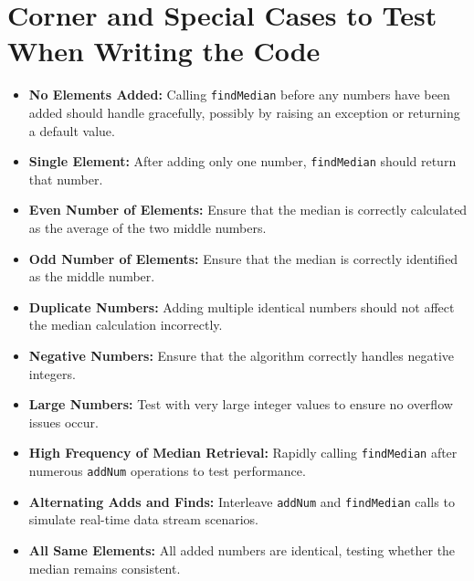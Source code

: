 \section*{Corner and Special Cases to Test When Writing the Code}

\begin{itemize}
    \item \textbf{No Elements Added:} Calling \texttt{findMedian} before any numbers have been added should handle gracefully, possibly by raising an exception or returning a default value.
    
    \item \textbf{Single Element:} After adding only one number, \texttt{findMedian} should return that number.
    
    \item \textbf{Even Number of Elements:} Ensure that the median is correctly calculated as the average of the two middle numbers.
    
    \item \textbf{Odd Number of Elements:} Ensure that the median is correctly identified as the middle number.
    
    \item \textbf{Duplicate Numbers:} Adding multiple identical numbers should not affect the median calculation incorrectly.
    
    \item \textbf{Negative Numbers:} Ensure that the algorithm correctly handles negative integers.
    
    \item \textbf{Large Numbers:} Test with very large integer values to ensure no overflow issues occur.
    
    \item \textbf{High Frequency of Median Retrieval:} Rapidly calling \texttt{findMedian} after numerous \texttt{addNum} operations to test performance.
    
    \item \textbf{Alternating Adds and Finds:} Interleave \texttt{addNum} and \texttt{findMedian} calls to simulate real-time data stream scenarios.
    
    \item \textbf{All Same Elements:} All added numbers are identical, testing whether the median remains consistent.
    

\end{itemize}
